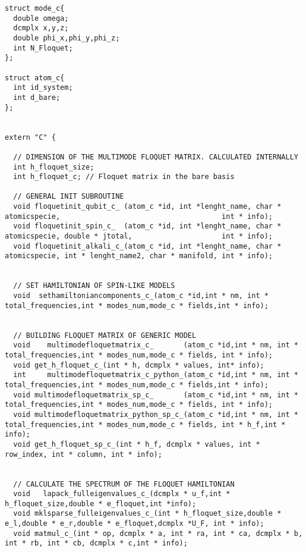 \documentclass[10pt,a4paper]{article}
\begin{document}
\begin{verbatim}
struct mode_c{
  double omega;
  dcmplx x,y,z;
  double phi_x,phi_y,phi_z;
  int N_Floquet;
};

struct atom_c{
  int id_system;
  int d_bare;
};


extern "C" {

  // DIMENSION OF THE MULTIMODE FLOQUET MATRIX. CALCULATED INTERNALLY
  int h_floquet_size;
  int h_floquet_c; // Floquet matrix in the bare basis

  // GENERAL INIT SUBROUTINE
  void floquetinit_qubit_c_ (atom_c *id, int *lenght_name, char * atomicspecie,                                      int * info);
  void floquetinit_spin_c_  (atom_c *id, int *lenght_name, char * atomicspecie, double * jtotal,                     int * info);
  void floquetinit_alkali_c_(atom_c *id, int *lenght_name, char * atomicspecie, int * lenght_name2, char * manifold, int * info);
  
       
  // SET HAMILTONIAN OF SPIN-LIKE MODELS
  void  sethamiltoniancomponents_c_(atom_c *id,int * nm, int * total_frequencies,int * modes_num,mode_c * fields,int * info);
  
  
  // BUILDING FLOQUET MATRIX OF GENERIC MODEL
  void    multimodefloquetmatrix_c_       (atom_c *id,int * nm, int * total_frequencies,int * modes_num,mode_c * fields, int * info);
  void get_h_floquet_c_(int * h, dcmplx * values, int* info);
  int     multimodefloquetmatrix_c_python_(atom_c *id,int * nm, int * total_frequencies,int * modes_num,mode_c * fields,int * info);
  void multimodefloquetmatrix_sp_c_       (atom_c *id,int * nm, int * total_frequencies,int * modes_num,mode_c * fields, int * info);
  void multimodefloquetmatrix_python_sp_c_(atom_c *id,int * nm, int * total_frequencies,int * modes_num,mode_c * fields, int * h_f,int * info);
  void get_h_floquet_sp_c_(int * h_f, dcmplx * values, int * row_index, int * column, int * info);

  
  // CALCULATE THE SPECTRUM OF THE FLOQUET HAMILTONIAN
  void   lapack_fulleigenvalues_c_(dcmplx * u_f,int * h_floquet_size,double * e_floquet,int *info);
  void mklsparse_fulleigenvalues_c_(int * h_floquet_size,double * e_l,double * e_r,double * e_floquet,dcmplx *U_F, int * info);
  void matmul_c_(int * op, dcmplx * a, int * ra, int * ca, dcmplx * b, int * rb, int * cb, dcmplx * c,int * info);
  

\end{verbatim}
\end{document}

